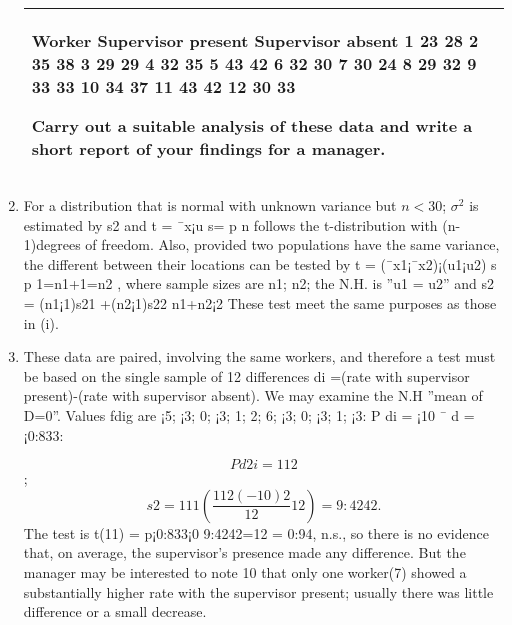 \documentclass[a4paper,12pt]{article}
\begin{document}
\begin{enumerate}
\begin{table}[ht!]
\begin{tabular}{|p{15cm}|}
Worker Supervisor present 
Supervisor absent 1 23 28 2 35 38 3 29 29 4 32 35 5 43 42 6 32 30 7 30 24 8 29 32 9 33 33 10 34 37 11 43 42 12 30 33 
 
 
Carry out a suitable analysis of these data and write a short report of your findings for a manager.  \\ \hline 
   \end{tabular}
 \end{table}

 
\item For a distribution that is normal with unknown variance but $n < 30$; $\sigma^2$ is estimated
by s2 and t = ¯x¡u
s=
p
n follows the t-distribution with (n-1)degrees of freedom.
Also, provided two populations have the same variance, the different between their
locations can be tested by t = (¯x1¡¯x2)¡(u1¡u2)
s
p
1=n1+1=n2
, where sample sizes are n1; n2; the
N.H. is ”u1 = u2” and s2 = (n1¡1)s21
+(n2¡1)s22
n1+n2¡2 These test meet the same purposes as
those in (i).
\item  These data are paired, involving the same workers, and therefore a test must be based on
the single sample of 12 differences di =(rate with supervisor present)-(rate with supervisor
absent). We may examine the N.H ”mean of D=0”. Values fdig are ¡5; ¡3; 0; ¡3; 1; 2; 6;
¡3; 0; ¡3; 1; ¡3:
P
di = ¡10 ¯ d = ¡0:833:

\[P
d2
i = 112\]; 
\[s2 = 1
11( \frac{112(-10)2}{12}
12 ) = 9:4242.\]
The test is t(11) = p¡0:833¡0
9:4242=12
= 0:94, n.s., so there is no evidence that, on average, the
supervisor’s presence made any difference. But the manager may be interested to note
10
that only one worker(7) showed a substantially higher rate with the supervisor present;
usually there was little difference or a small decrease.

\end{enumerate}
\end{document}
